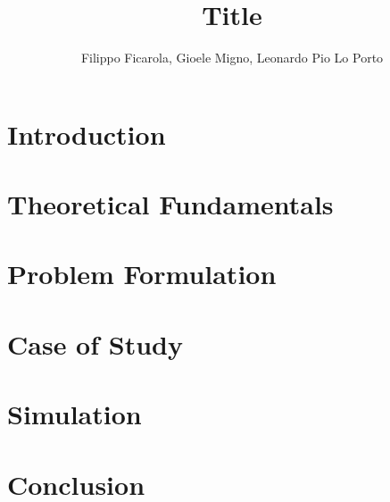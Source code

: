 \documentclass[conference]{IEEEtran}
\begin{document}
    
    \title{\LARGE Title}
    \author{Filippo Ficarola, Gioele Migno, Leonardo Pio Lo Porto}
    \maketitle
    
    
    
    \section{Introduction}
        
    
    \section{Theoretical Fundamentals}
        
        
    \section{Problem Formulation}
        
    
    \section{Case of Study}
        

    \section{Simulation}
        
        
    \section{Conclusion}
        
        
    
\end{document}

